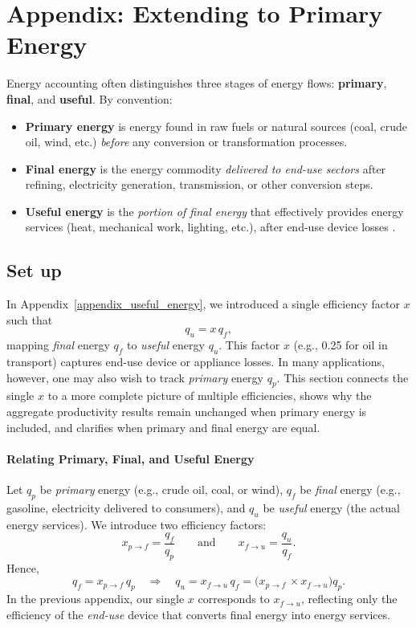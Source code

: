 

\section{Appendix: Extending to Primary Energy}
\label{appendix_primary_energy}

Energy accounting often distinguishes three stages of energy flows: \textbf{primary}, \textbf{final}, and \textbf{useful}. By convention:

\begin{itemize} \item \textbf{Primary energy} is energy found in raw fuels or natural sources (coal, crude oil, wind, etc.) \emph{before} any conversion or transformation processes. \item \textbf{Final energy} is the energy commodity \emph{delivered to end-use sectors} after refining, electricity generation, transmission, or other conversion steps. \item \textbf{Useful energy} is the \emph{portion of final energy} that effectively provides energy services (heat, mechanical work, lighting, etc.), after end-use device losses \citep{wayEmpiricallyGroundedTechnology2022}. \end{itemize}

\subsection{Set up}

In Appendix~\ref{appendix_useful_energy}, we introduced a single efficiency factor $x$ such that 
\[
  q_u = x\,q_f,
\]
mapping \emph{final} energy $q_f$ to \emph{useful} energy $q_u$. This factor $x$ (e.g., 0.25 for oil in transport) captures end-use device or appliance losses. In many applications, however, one may also wish to track \emph{primary} energy $q_p$. This section connects the single $x$ to a more complete picture of multiple efficiencies, shows why the aggregate productivity results remain unchanged when primary energy is included, and clarifies when primary and final energy are equal.

\paragraph{Relating Primary, Final, and Useful Energy}
\vspace*{1em}
Let $q_p$ be \emph{primary} energy (e.g., crude oil, coal, or wind), $q_f$ be \emph{final} energy (e.g., gasoline, electricity delivered to consumers), and $q_u$ be \emph{useful} energy (the actual energy services).  We introduce two efficiency factors:
\[
  x_{p\to f} = \frac{q_f}{q_p}
  \quad\quad\text{and}\quad\quad
  x_{f\to u} = \frac{q_u}{q_f}.
\]
Hence,
\[
  q_f = x_{p\to f}\,q_p
  \quad\Longrightarrow\quad
  q_u = x_{f\to u}\, q_f
      = \bigl(x_{p\to f}\,\times x_{f\to u}\bigr) q_p.
\]
In the previous appendix, our single $x$ corresponds to $x_{f\to u}$, reflecting only the efficiency of the \emph{end-use} device that converts final energy into energy services.

